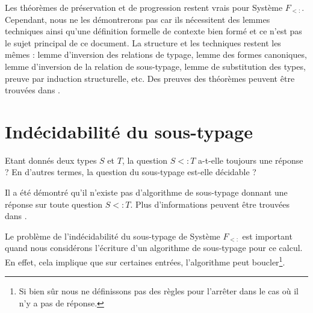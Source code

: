Les théorèmes de préservation et de progression restent vrais pour Système
$F_{<:}$. Cependant, nous ne les démontrerons pas car ils nécessitent des lemmes
techniques ainsi qu'une définition formelle de contexte bien formé et ce n'est
pas le sujet principal de ce document. La structure
et les techniques restent les mêmes : lemme d'inversion des relations de typage,
lemme des formes canoniques, lemme d'inversion de la relation de sous-typage, lemme de
substitution des types, preuve par induction structurelle, etc.
Des preuves des théorèmes peuvent être trouvées dans
\cite{tapl-bounded-quantification}.

\section{Indécidabilité du sous-typage}

Etant donnés deux types $S$ et $T$, la question $S <: T$ a-t-elle
toujours une réponse ? En d'autres termes, la question du sous-typage est-elle
décidable ?

Il a été démontré qu'il n'existe pas d'algorithme de sous-typage donnant une
réponse sur toute question $S <: T$. Plus d'informations peuvent être trouvées
dans \cite{tapl-bounded-quantification-metatheory}.

Le problème de l'indécidabilité du sous-typage de Système $F_{<:}$ est important
quand nous considérons l'écriture d'un algorithme de sous-typage pour ce calcul.
En effet, cela implique que sur certaines entrées, l'algorithme peut
boucler\footnote{Si bien sûr nous ne définissons pas des règles pour l'arrêter
  dans le cas où il n'y a pas de réponse.}.